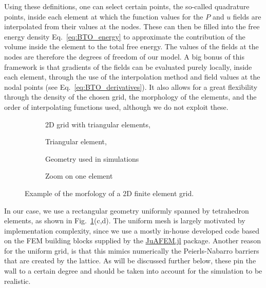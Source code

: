 Using these definitions, one can select certain points, the so-called quadrature points, inside each element at which the function values for the $P$ and $u$ fields are interpolated from their values at the nodes.
These can then be filled into the free energy density Eq.~\ref{eq:BTO_energy} to approximate the contribution of the volume inside the element to the total free energy.
The values of the fields at the nodes are therefore the degrees of freedom of our model. 
A big bonus of this framework is that gradients of the fields can be evaluated purely locally, inside each element, through the use of the interpolation method and field values at the nodal points (see Eq.~\ref{eq:BTO_derivatives}).
It also allows for a great flexibility through the density of the chosen grid, the morphology of the elements, and the order of interpolating functions used, although we do not exploit these.

\begin{figure}
	\begin{subfigure}{0.49\textwidth}
		\caption{2D grid with triangular elements, \cite{Biner}}
	\end{subfigure}
	\begin{subfigure}{0.49\textwidth}
		\caption{Triangular element, }
	\end{subfigure}
	\begin{subfigure}{0.49\textwidth}
		\caption{Geometry used in simulations}
	\end{subfigure}
	\begin{subfigure}{0.49\textwidth}
		\caption{Zoom on one element}
	\end{subfigure}
	\caption{\label{fig:BTO_fem} Example of the morfology of a 2D finite element grid.}
\end{figure}

In our case, we use a rectangular geometry uniformly spanned by tetrahedron elements, as shown in Fig.~\ref{fig:BTO_fem}(c,d).
The uniform mesh is largely motivated by implementation complexity, since we use a mostly in-house developed code based on the FEM building blocks supplied by the \href{https://github.com/KristofferC/JuAFEM.jl}{JuAFEM.jl} package.
Another reason for the uniform grid, is that this mimics numerically the Peierls-Nabarro barriers that are created by the lattice.
As will be discussed further below, these pin the wall to a certain degree and should be taken into account for the simulation to be realistic.

